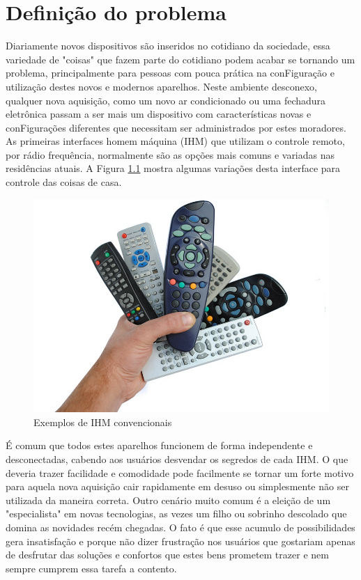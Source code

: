 \chapter{Definição do problema}

Diariamente novos dispositivos são inseridos no cotidiano da sociedade, essa variedade de "coisas" que fazem parte do cotidiano podem acabar se tornando um problema, principalmente para pessoas com pouca prática na conFiguração e utilização destes novos e modernos aparelhos. Neste ambiente desconexo, qualquer nova aquisição, como um novo ar condicionado ou uma fechadura eletrônica passam a ser mais um dispositivo com características novas e conFigurações diferentes que necessitam ser administrados por estes moradores.
As primeiras interfaces homem máquina (IHM) que utilizam o controle remoto, por rádio frequência, normalmente são as opções mais comuns e variadas nas residências atuais. A Figura \ref{controle} mostra algumas variações desta interface para controle das coisas de casa.

\begin{figure}[H]
\caption{\label{controle} Exemplos de IHM convencionais}
\includegraphics[scale=0.35]{img/controle-remoto.png}
\end{figure}

É comum que todos estes aparelhos funcionem de forma independente e desconectadas, cabendo aos usuários desvendar os segredos de cada IHM. O que deveria trazer facilidade e comodidade pode facilmente se tornar um forte motivo para aquela nova aquisição cair rapidamente em desuso ou simplesmente não ser utilizada da maneira correta. Outro cenário muito comum é a eleição de um "especialista" em novas tecnologias, as vezes um filho ou sobrinho descolado que domina as novidades recém chegadas. O fato é que esse acumulo de possibilidades gera insatisfação e porque não dizer frustração nos usuários que gostariam apenas de desfrutar das soluções e confortos que estes bens prometem trazer e nem sempre cumprem essa tarefa a contento.


